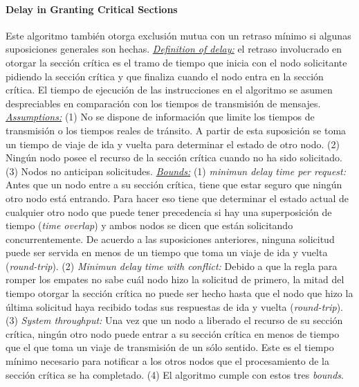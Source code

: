 \paragraph{\textnormal{\textbf{Delay in Granting Critical Sections}}}
Este algoritmo también otorga exclusión mutua con un retraso mínimo si algunas suposiciones generales son hechas. \underline{\emph{Definition of delay:}} el retraso involucrado en otorgar la sección crítica es el tramo de tiempo que inicia con el nodo solicitante pidiendo la sección crítica y que finaliza cuando el nodo entra en la sección crítica. El tiempo de ejecución de las instrucciones en el algoritmo se asumen despreciables en comparación con los tiempos de transmisión de mensajes. \underline{\emph{Assumptions:}} (1) No se dispone de información que limite los tiempos de transmisión o los tiempos reales de tránsito. A partir de esta suposición se toma un tiempo de viaje de ida y vuelta para determinar el estado de otro nodo. (2) Ningún nodo posee el recurso de la sección crítica cuando no ha sido solicitado. (3) Nodos no anticipan solicitudes. \underline{\emph{Bounds:}} (1) \emph{minimun delay time per request:} Antes que un nodo entre a su sección crítica, tiene que estar seguro que ningún otro nodo está entrando. Para hacer eso tiene que determinar el estado actual de cualquier otro nodo que puede tener precedencia si hay una superposición de tiempo (\emph{time overlap}) y ambos nodos se dicen que están solicitando concurrentemente. De acuerdo a las suposiciones anteriores, ninguna solicitud puede ser servida en menos de un tiempo que toma un viaje de ida y vuelta (\emph{round-trip}). (2) \emph{Minimun delay time with conflict:} Debido a que la regla para romper los empates no sabe cuál nodo hizo la solicitud de primero, la mitad del tiempo otorgar la sección crítica no puede ser hecho hasta que el nodo que hizo la última solicitud haya recibido todas sus respuestas de ida y vuelta (\emph{round-trip}). (3) \emph{System throughput:} Una vez que un nodo a liberado el recurso de su sección crítica, ningún otro nodo puede entrar a su sección crítica en menos de tiempo que el que toma un viaje de transmisión de un sólo sentido. Este es el tiempo mínimo necesario para notificar a los otros nodos que el procesamiento de la sección crítica se ha completado. (4) El algoritmo cumple con estos tres \emph{bounds}.

